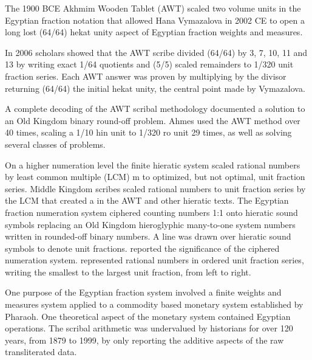 \documentclass[12pt]{article}
\begin{document}
The 1900 BCE Akhmim Wooden Tablet (AWT) scaled two volume units in the Egyptian fraction notation that allowed Hana Vymazalova in 2002 CE to open a long lost (64/64) hekat unity aspect of Egyptian fraction weights and measures. 

In 2006 scholars showed that the AWT scribe divided (64/64) by 3, 7, 10, 11 and 13 by writing exact 1/64 quotients and (5/5) scaled remainders to 1/320 unit fraction series. Each AWT answer was proven by multiplying by the divisor returning (64/64) the initial hekat unity, the central point made by Vymazalova. 

A complete decoding of the AWT scribal methodology documented a solution to an Old Kingdom binary round-off problem. Ahmes used the AWT method over 40 times, scaling a 1/10 hin unit to 1/320 ro unit 29 times, as well as solving several classes of problems. 

On a higher numeration level the finite hieratic system scaled rational numbers by least common multiple (LCM) m to optimized, but not optimal, unit fraction series. Middle Kingdom scribes scaled rational numbers to unit fraction series by the LCM that created a  in the AWT and other hieratic texts. The Egyptian fraction numeration system ciphered counting numbers 1:1 onto hieratic sound symbols replacing an Old Kingdom hieroglyphic many-to-one system numbers written in rounded-off binary numbers. A line was drawn over hieratic sound symbols to denote unit fractions.  reported the significance of the ciphered numeration system.  represented rational numbers in ordered unit fraction series, writing the smallest to the largest unit fraction, from left to right.

One purpose of the Egyptian fraction system involved a finite weights and measures system applied to a commodity based monetary system established by Pharaoh. One theoretical aspect of the monetary system contained Egyptian  operations. The scribal arithmetic was undervalued by historians for over 120 years, from 1879 to 1999, by only reporting the additive aspects of the raw transliterated data. 
\end{document}
